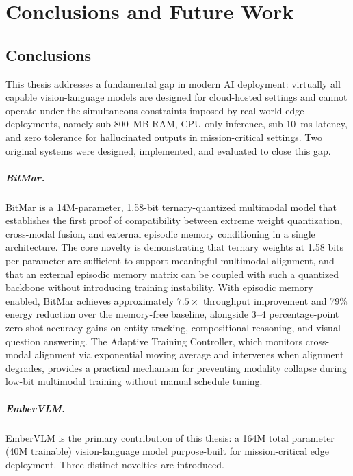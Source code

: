 \chapter{Conclusions and Future Work}
\label{cha:conclusion}

\section{Conclusions}
\label{sec:conclusions}

This thesis addresses a fundamental gap in modern AI deployment: virtually all capable vision-language models are designed for cloud-hosted settings and cannot operate under the simultaneous constraints imposed by real-world edge deployments, namely sub-800~MB RAM, CPU-only inference, sub-10~ms latency, and zero tolerance for hallucinated outputs in mission-critical settings. Two original systems were designed, implemented, and evaluated to close this gap.

\paragraph{BitMar.}
BitMar is a 14M-parameter, 1.58-bit ternary-quantized multimodal model that establishes the first proof of compatibility between extreme weight quantization, cross-modal fusion, and external episodic memory conditioning in a single architecture. The core novelty is demonstrating that ternary weights at 1.58 bits per parameter are sufficient to support meaningful multimodal alignment, and that an external episodic memory matrix can be coupled with such a quantized backbone without introducing training instability. With episodic memory enabled, BitMar achieves approximately $7.5\times$ throughput improvement and 79\% energy reduction over the memory-free baseline, alongside 3--4 percentage-point zero-shot accuracy gains on entity tracking, compositional reasoning, and visual question answering. The Adaptive Training Controller, which monitors cross-modal alignment via exponential moving average and intervenes when alignment degrades, provides a practical mechanism for preventing modality collapse during low-bit multimodal training without manual schedule tuning.

\paragraph{EmberVLM.}
EmberVLM is the primary contribution of this thesis: a 164M total parameter (40M trainable) vision-language model purpose-built for mission-critical edge deployment. Three distinct novelties are introduced.


